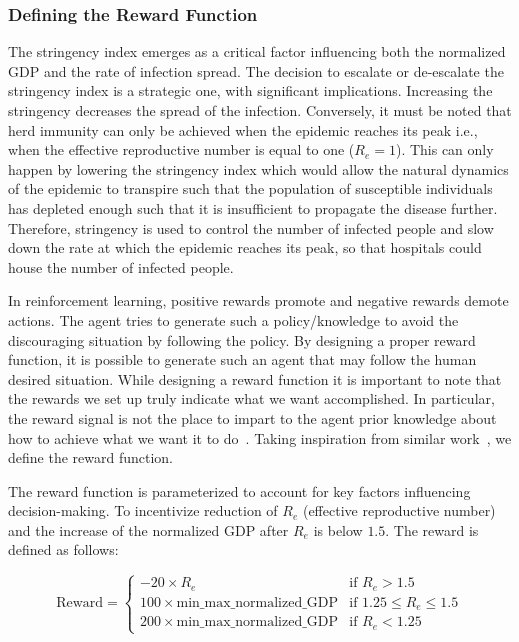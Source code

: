 \documentclass[tikz,fleqn,12pt]{wlscirep}
\begin{document}
\subsubsection{Defining the Reward Function}\label{defining_reward_function}
The stringency index emerges as a critical factor influencing both the normalized GDP and the rate of infection spread. The decision to escalate or de-escalate the stringency index is a strategic one, with significant implications. Increasing the stringency decreases the spread of the infection. Conversely, it must be noted that herd immunity can only be achieved when the epidemic reaches its peak i.e., when the effective reproductive number is equal to one ($R_e = 1$). This can only happen by lowering the stringency index which would allow the natural dynamics of the epidemic to transpire such that the population of susceptible individuals has depleted enough such that it is insufficient to propagate the disease further. Therefore, stringency is used to control the number of infected people and slow down the rate at which the epidemic reaches its peak, so that hospitals could house the number of infected people.

In reinforcement learning, positive rewards promote and negative rewards demote actions. The agent tries to generate such a policy/knowledge to avoid the discouraging situation by following the policy. By designing a proper reward function, it is possible to generate such an agent that may follow the human desired situation. While designing a reward function it is important to note that the rewards we set up truly indicate what we want accomplished. In particular, the reward signal is not the place to impart to the agent prior knowledge about how to achieve what we want it to do~\cite{sutton2018reinforcement}. Taking inspiration from similar work~\cite{Ohi2020}, we define the reward function. %

The reward function is parameterized to account for key factors influencing decision-making. To incentivize reduction of $R_e$ (effective reproductive number) and the increase of the normalized GDP after $R_e$ is below $1.5$. The reward is defined as follows:

\[
\textrm{Reward} = \begin{cases}
-20 \times R_e & \textrm{if } R_e > 1.5 \\
100 \times \textrm{min\_max\_normalized\_GDP} & \textrm{if } 1.25 \leq R_e \leq 1.5 \\
200 \times \textrm{min\_max\_normalized\_GDP} & \textrm{if } R_e < 1.25
\end{cases}
\]
\end{document}
